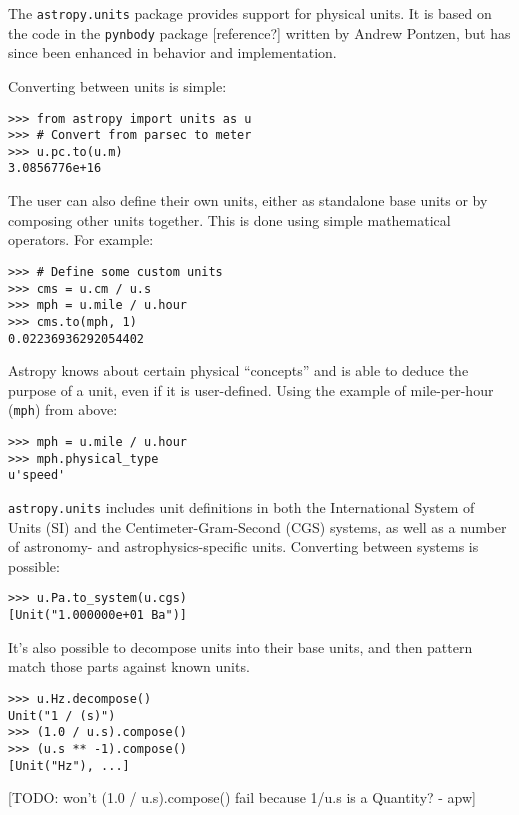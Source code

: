 \documentclass[traditabstract]{aa}
\begin{document}

The \texttt{astropy.units} package provides support for physical
units.  It is based on the code in the \texttt{pynbody} package
[reference?]  written by Andrew Pontzen, but has since been enhanced
in behavior and implementation.

Converting between units is simple:
\begin{verbatim}
>>> from astropy import units as u
>>> # Convert from parsec to meter
>>> u.pc.to(u.m)
3.0856776e+16
\end{verbatim}
The user can also define their own units, either as standalone base
units or by composing other units together.  This is done using simple
mathematical operators.  For example:
\begin{verbatim}
>>> # Define some custom units
>>> cms = u.cm / u.s
>>> mph = u.mile / u.hour
>>> cms.to(mph, 1)
0.02236936292054402
\end{verbatim}

Astropy knows about certain physical ``concepts'' and is able to
deduce the purpose of a unit, even if it is user-defined.  Using the
example of mile-per-hour (\texttt{mph}) from above:
\begin{verbatim}
>>> mph = u.mile / u.hour
>>> mph.physical_type
u'speed'
\end{verbatim}

\texttt{astropy.units} includes unit definitions in both the
International System of Units (SI) and the Centimeter-Gram-Second
(CGS) systems, as well as a number of astronomy- and
astrophysics-specific units.  Converting between systems is possible:
\begin{verbatim}
>>> u.Pa.to_system(u.cgs)
[Unit("1.000000e+01 Ba")]
\end{verbatim}

It's also possible to decompose units into their base units, and then
pattern match those parts against known units.
\begin{verbatim}
>>> u.Hz.decompose()
Unit("1 / (s)")
>>> (1.0 / u.s).compose()
>>> (u.s ** -1).compose()
[Unit("Hz"), ...]
\end{verbatim}
[TODO: won't (1.0 / u.s).compose() fail because 1/u.s is a Quantity? -
  apw]
\end{document}
